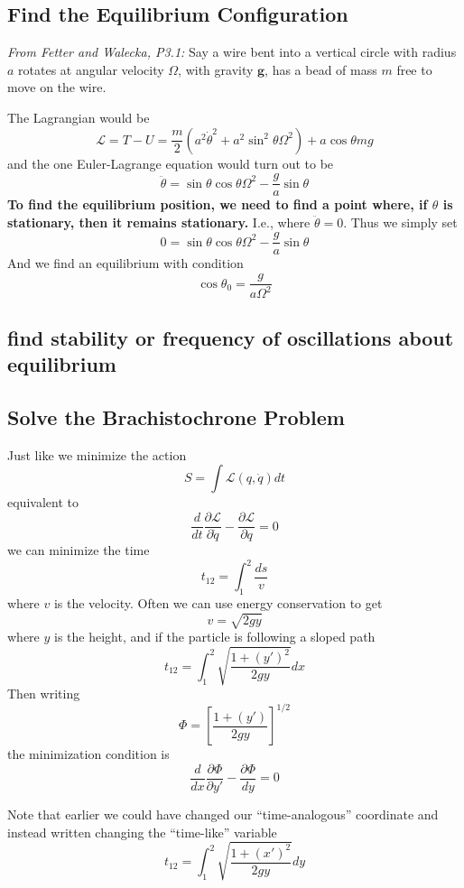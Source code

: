 \documentclass[25pt]{book}
\begin{document}
	\subsection{Find the Equilibrium Configuration}
	
	\textit{From Fetter and Walecka, P3.1:} Say a wire bent into a vertical circle with radius $a$ rotates at angular velocity $\Omega$, with gravity $\textbf{g}$, has a bead of mass $m$ free to move on the wire. 
	
	The Lagrangian would be
	\[
	\mathcal{L} = T - U = \frac{m}{2}\left( a^2 \dot{\theta}^2 + a^2 \sin^2 \theta \Omega^2  \right) + a \cos \theta mg
	\]
	and the one Euler-Lagrange equation would turn out to be
	\[
	\ddot{\theta} = \sin \theta \cos \theta \Omega^2 - \frac{g}{a} \sin \theta
	\]
	\textbf{To find the equilibrium position, we need to find a point where, if $\theta$ is stationary, then it remains stationary.} I.e., where $\ddot{\theta} = 0$. Thus we simply set
	\[
	0 = \sin \theta \cos \theta \Omega^2 - \frac{g}{a} \sin \theta
	\]
	And we find an equilibrium with condition
	\[
	\cos \theta_0 = \frac{g}{a \Omega^2}
	\]
	
	\subsection{find stability or frequency of oscillations about equilibrium}
	
	\subsection{Solve the Brachistochrone Problem}
	
	Just like we minimize the action
	\[
	S = \int \mathcal{L}(q, \dot{q}) dt
	\]
	equivalent to
	\[
	\frac{d}{dt} \frac{\partial \mathcal{L}}{\partial \dot{q}} - \frac{\partial \mathcal{L}}{\partial q}= 0
	\]
	we can minimize the time
	\[
	t_{12} = \int_1^{2} \frac{ds}{v}
	\]
	where $v$ is the velocity. Often we can use energy conservation to get
	\[
	v = \sqrt{2gy}
	\]
	where $y$ is the height, and if the particle is following a sloped path
	\[
	t_{12} = \int_1^{2} \sqrt{\frac{1 + (y')^2}{2gy} } dx
	\]
	Then writing
	\[
	\Phi = \left[ \frac{1 + (y')}{2gy} \right]^{1/2}
	\]
	the minimization condition is 
	\[
	\frac{d}{dx} \frac{\partial \Phi}{\partial y'} - \frac{\partial \Phi}{dy} = 0
	\]
	
	Note that earlier we could have changed our ``time-analogous'' coordinate and instead written
	changing the ``time-like'' variable
	\[
	t_{12} = \int_1^{2} \sqrt{\frac{1 + (x')^2}{2gy} } dy
	\]
\end{document}
